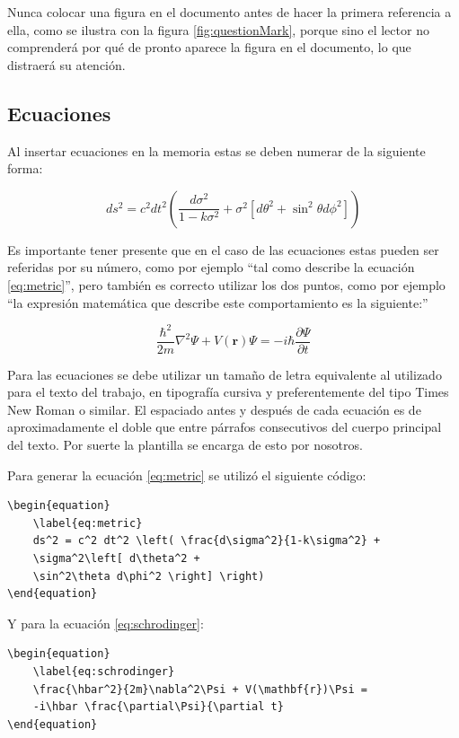 Nunca colocar una figura en el documento antes de hacer la primera referencia a ella, como se ilustra con la figura \ref{fig:questionMark}, porque sino el lector no comprenderá por qué de pronto aparece la figura en el documento, lo que distraerá su atención.

\subsection{Ecuaciones}
\label{sec:Ecuaciones}

Al insertar ecuaciones en la memoria estas se deben numerar de la siguiente forma:

\begin{equation}
	\label{eq:metric}
	ds^2 = c^2 dt^2 \left( \frac{d\sigma^2}{1-k\sigma^2} + \sigma^2\left[ d\theta^2 + \sin^2\theta d\phi^2 \right] \right)
\end{equation}
                                                        
Es importante tener presente que en el caso de las ecuaciones estas pueden ser referidas por su número, como por ejemplo ``tal como describe la ecuación \ref{eq:metric}'', pero también es correcto utilizar los dos puntos, como por ejemplo ``la expresión matemática que describe este comportamiento es la siguiente:''

\begin{equation}
	\label{eq:schrodinger}
	\frac{\hbar^2}{2m}\nabla^2\Psi + V(\mathbf{r})\Psi = -i\hbar \frac{\partial\Psi}{\partial t}
\end{equation}

Para las ecuaciones se debe utilizar un tamaño de letra equivalente al utilizado para el texto del trabajo, en tipografía cursiva y preferentemente del tipo Times New Roman o similar. El espaciado antes y después de cada ecuación es de aproximadamente el doble que entre párrafos consecutivos del cuerpo principal del texto. Por suerte la plantilla se encarga de esto por nosotros.

Para generar la ecuación \ref{eq:metric} se utilizó el siguiente código:

\begin{verbatim}
\begin{equation}
	\label{eq:metric}
	ds^2 = c^2 dt^2 \left( \frac{d\sigma^2}{1-k\sigma^2} + 
	\sigma^2\left[ d\theta^2 + 
	\sin^2\theta d\phi^2 \right] \right)
\end{equation}
\end{verbatim}

Y para la ecuación \ref{eq:schrodinger}:

\begin{verbatim}
\begin{equation}
	\label{eq:schrodinger}
	\frac{\hbar^2}{2m}\nabla^2\Psi + V(\mathbf{r})\Psi = 
	-i\hbar \frac{\partial\Psi}{\partial t}
\end{equation}

\end{verbatim}